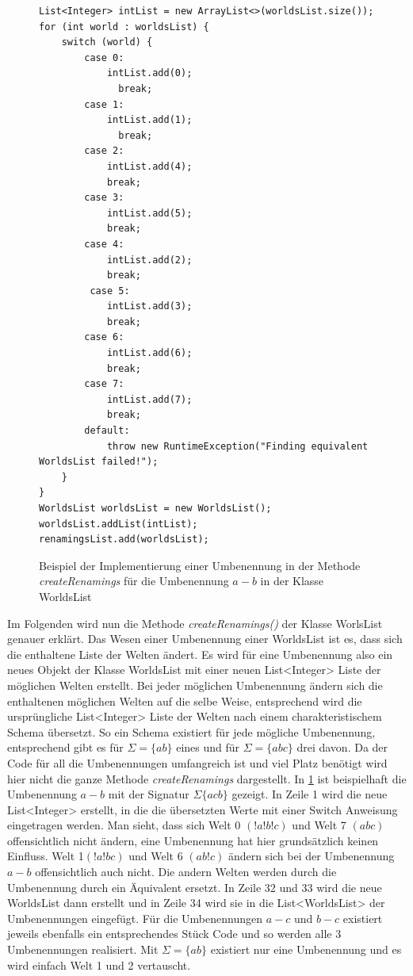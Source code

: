 \documentclass[12pt,a4paper]{article}
\begin{document}
\begin{figure}
\begin{lstlisting}
List<Integer> intList = new ArrayList<>(worldsList.size());
for (int world : worldsList) {
    switch (world) {
        case 0:
            intList.add(0);
              break;
        case 1:
            intList.add(1);
              break;
        case 2:
            intList.add(4);
            break;
        case 3:
            intList.add(5);
            break;
        case 4:
            intList.add(2);
            break;
         case 5:
            intList.add(3);
            break;
        case 6:
            intList.add(6);
            break;
        case 7:
            intList.add(7);
            break;
        default:
            throw new RuntimeException("Finding equivalent WorldsList failed!");
    }
}
WorldsList worldsList = new WorldsList();
worldsList.addList(intList);
renamingsList.add(worldsList);
\end{lstlisting}
\caption{Beispiel der Implementierung einer Umbenennung in der Methode \textit{createRenamings} für die Umbenennung $a-b$ in der Klasse WorldsList}
\label{code:renaming}
\end{figure}


Im Folgenden wird nun die Methode \textit{createRenamings()} der Klasse WorlsList genauer erklärt. Das Wesen einer Umbenennung einer WorldsList ist es, dass sich die enthaltene Liste der Welten ändert. Es wird für eine Umbenennung also ein neues Objekt der Klasse WorldsList mit einer neuen List<Integer> Liste der möglichen Welten erstellt. Bei jeder möglichen Umbenennung ändern sich die enthaltenen möglichen Welten auf die selbe Weise, entsprechend wird die ursprüngliche List<Integer> Liste der Welten nach einem charakteristischem Schema \glqq übersetzt\grqq. So ein Schema existiert für jede mögliche Umbenennung, entsprechend gibt es für $\Sigma=\{ab\}$ eines und für $\Sigma=\{abc\}$ drei davon. Da der Code für all die Umbenennungen umfangreich ist und viel Platz benötigt wird hier nicht die ganze Methode \textit{createRenamings} dargestellt. In \ref{code:renaming} ist beispielhaft die Umbenennung $a-b$ mit der Signatur $\Sigma\{acb\}$ gezeigt. In Zeile 1 wird die neue List<Integer> erstellt, in die die übersetzten Werte mit einer Switch Anweisung eingetragen werden. Man sieht, dass sich  Welt 0 $(!a!b!c)$ und Welt 7 $(abc)$ offensichtlich nicht ändern, eine Umbenennung hat hier grundsätzlich keinen Einfluss. Welt 1$(!a!bc)$ und Welt 6 $(ab!c)$ ändern sich bei der Umbenennung $a-b$ offensichtlich auch nicht. Die andern Welten werden durch die Umbenennung durch ein Äquivalent ersetzt. In Zeile 32 und 33 wird die neue WorldsList dann erstellt und in Zeile 34 wird sie in die List<WorldsList> der Umbenennungen eingefügt.  Für die Umbenennungen $a-c$ und $b-c$ existiert jeweils ebenfalls ein entsprechendes Stück Code und so werden alle 3 Umbenennungen realisiert. Mit $ \Sigma=\{ab\}$ existiert nur eine Umbenennung und es wird einfach Welt 1 und 2 vertauscht.
\end{document}
